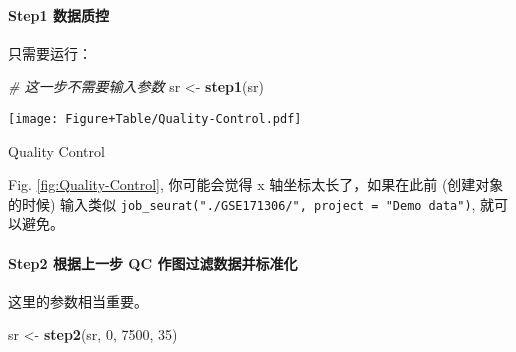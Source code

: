 \documentclass[
]{article}
\newenvironment{Shaded}{\begin{snugshade}}{\end{snugshade}}
\newcommand{\CommentTok}[1]{\textcolor[rgb]{0.56,0.35,0.01}{\textit{#1}}}
\newcommand{\DecValTok}[1]{\textcolor[rgb]{0.00,0.00,0.81}{#1}}
\newcommand{\KeywordTok}[1]{\textcolor[rgb]{0.13,0.29,0.53}{\textbf{#1}}}
\newcommand{\NormalTok}[1]{#1}
\newcommand{\OperatorTok}[1]{\textcolor[rgb]{0.81,0.36,0.00}{\textbf{#1}}}
\newcommand{\StringTok}[1]{\textcolor[rgb]{0.31,0.60,0.02}{#1}}
\begin{document}
\hypertarget{step1-ux6570ux636eux8d28ux63a7}{%
\paragraph{Step1 数据质控}\label{step1-ux6570ux636eux8d28ux63a7}}

只需要运行：

\begin{Shaded}
\begin{Highlighting}[]
\CommentTok{\# 这一步不需要输入参数}
\NormalTok{sr \textless{}{-}}\StringTok{ }\KeywordTok{step1}\NormalTok{(sr)}
\end{Highlighting}
\end{Shaded}

\begin{Shaded}
\end{Shaded}

\def\@captype{figure}
\begin{center}
\texttt{[image: Figure+Table/Quality-Control.pdf]}
\caption{Quality Control}\label{fig:Quality-Control}
\end{center}

Fig. \ref{fig:Quality-Control}, 你可能会觉得 x 轴坐标太长了，如果在此前
(创建对象的时候) 输入类似 \texttt{job\_seurat("./GSE171306/",\ project\ =\ "Demo\ data")}, 就可以避免。

\hypertarget{step2-ux6839ux636eux4e0aux4e00ux6b65-qc-ux4f5cux56feux8fc7ux6ee4ux6570ux636eux5e76ux6807ux51c6ux5316}{%
\paragraph{Step2 根据上一步 QC 作图过滤数据并标准化}\label{step2-ux6839ux636eux4e0aux4e00ux6b65-qc-ux4f5cux56feux8fc7ux6ee4ux6570ux636eux5e76ux6807ux51c6ux5316}}

这里的参数相当重要。

\begin{Shaded}
\begin{Highlighting}[]
\NormalTok{sr \textless{}{-}}\StringTok{ }\KeywordTok{step2}\NormalTok{(sr, }\DecValTok{0}\NormalTok{, }\DecValTok{7500}\NormalTok{, }\DecValTok{35}\NormalTok{)}
\end{Highlighting}
\end{Shaded}
\end{document}
